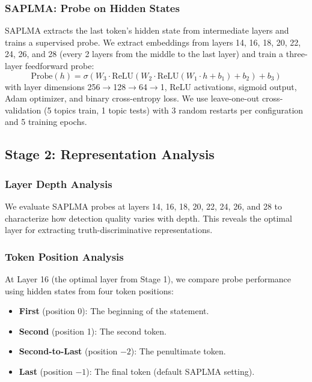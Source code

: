 \documentclass[11pt]{article}
\begin{document}
\subsubsection{SAPLMA: Probe on Hidden States}

SAPLMA \citep{azaria2023internal} extracts the last token's hidden state from intermediate layers and trains a supervised probe. We extract embeddings from layers 14, 16, 18, 20, 22, 24, 26, and 28 (every 2 layers from the middle to the last layer) and train a three-layer feedforward probe:
\begin{equation}
    \text{Probe}(h) = \sigma(W_3 \cdot \text{ReLU}(W_2 \cdot \text{ReLU}(W_1 \cdot h + b_1) + b_2) + b_3)
\end{equation}
with layer dimensions 256$\to$128$\to$64$\to$1, ReLU activations, sigmoid output, Adam optimizer, and binary cross-entropy loss. We use leave-one-out cross-validation (5 topics train, 1 topic tests) with 3 random restarts per configuration and 5 training epochs.

\subsection{Stage 2: Representation Analysis}
\label{sec:analysis}

\subsubsection{Layer Depth Analysis}

We evaluate SAPLMA probes at layers 14, 16, 18, 20, 22, 24, 26, and 28 to characterize how detection quality varies with depth. This reveals the optimal layer for extracting truth-discriminative representations.

\subsubsection{Token Position Analysis}

At Layer 16 (the optimal layer from Stage 1), we compare probe performance using hidden states from four token positions:
\begin{itemize}
    \item \textbf{First} (position 0): The beginning of the statement.
    \item \textbf{Second} (position 1): The second token.
    \item \textbf{Second-to-Last} (position $-2$): The penultimate token.
    \item \textbf{Last} (position $-1$): The final token (default SAPLMA setting).
\end{itemize}
\end{document}

